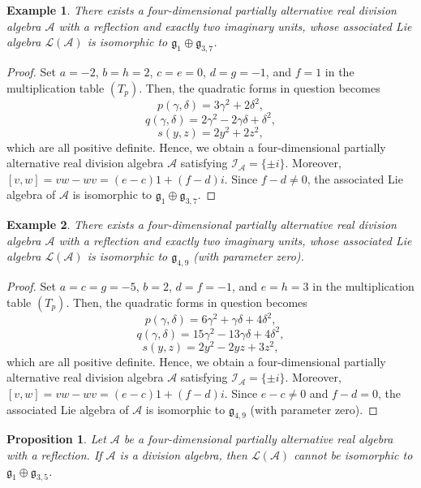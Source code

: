 \documentclass{amsart}
\theoremstyle{definition}
\theoremstyle{plain}
\newtheorem{proposition}{Proposition}
\newtheorem{example}{Example}
\begin{document}
\begin{example}
There exists a four-dimensional partially alternative real division algebra $\mathcal{A}$ with a reflection and exactly two imaginary units,  whose associated Lie algebra  $\mathcal L (\mathcal A)$ is isomorphic to $\mathfrak g_1\oplus \mathfrak g_{3,7}$.
\end{example}
\begin{proof}
Set $a=-2$, $b=h=2$, $c=e=0$, $d=g=-1$, and $f=1$ in the multiplication table $(T_p)$. Then, the quadratic forms in question becomes
$$p(\gamma,\delta)=3\gamma^2+2\delta^2,$$
$$q(\gamma,\delta)=2\gamma^2-2\gamma\delta+\delta^2,$$
$$s(y,z)=2y^2+2z^2,$$
which are all positive definite. Hence, we obtain a four-dimensional partially alternative real division algebra $\mathcal{A}$ satisfying $\mathcal{I_A}=\{\pm i\}$. Moreover, $[v,w]=vw-wv=(e-c)1+(f-d)i$. Since $f-d\neq 0$, the associated Lie algebra of $\mathcal{A}$ is isomorphic to $\mathfrak g_1\oplus \mathfrak g_{3,7}$.
\end{proof}

\begin{example}
There exists a four-dimensional partially alternative real division algebra $\mathcal{A}$ with a reflection and exactly two imaginary units, whose associated Lie algebra $ \mathcal L (\mathcal A)$ is isomorphic to $\mathfrak g_{4,9}$ (with parameter zero).
\end{example}
\begin{proof}
Set $a=c=g=-5$, $b=2$, $d=f=-1$, and $e=h=3$ in the multiplication table $(T_p)$. Then, the quadratic forms in question becomes
$$p(\gamma,\delta)=6\gamma^2+\gamma\delta+4\delta^2,$$
$$q(\gamma,\delta)=15\gamma^2-13\gamma\delta+4\delta^2,$$
$$s(y,z)=2y^2-2yz+3z^2,$$
which are all positive definite. Hence, we obtain a four-dimensional partially alternative real division algebra $\mathcal{A}$ satisfying $\mathcal{I_A}=\{\pm i\}$. Moreover, $[v,w]=vw-wv=(e-c)1+(f-d)i$. Since $e-c\neq 0$ and $f-d=0$, the associated Lie algebra of $\mathcal{A}$ is isomorphic to $\mathfrak g_{4,9}$ (with parameter zero).
\end{proof}

\begin{proposition}
Let $\mathcal{A}$ be a four-dimensional partially alternative real algebra with a reflection. If $\mathcal{A}$ is a division algebra, then  $\mathcal L (\mathcal A)$ cannot be isomorphic to $\mathfrak g_1\oplus \mathfrak g_{3,5}$.
\end{proposition}
\end{document}
